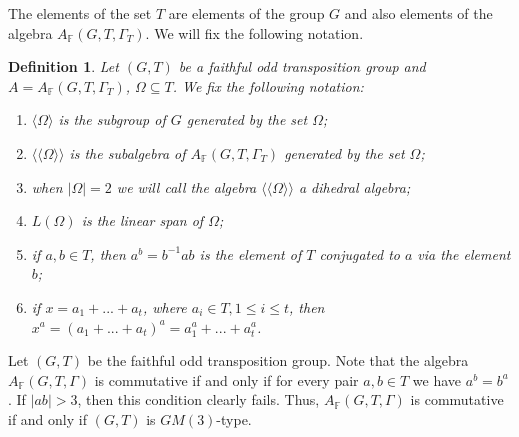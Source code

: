 \documentclass[12pt]{article}
\newcommand\F{\mathbb{F}}
\newcommand\la{\langle}
\newcommand\ra{\rangle}
\newcommand\lla{\la\!\la}
\newcommand\rra{\ra\!\ra}
\newtheorem{defi}{Definition}
\begin{document}
The elements of the set $T$ are elements of the group $G$ and also elements of the algebra $A_{\F}(G,T,\Gamma_T)$. We will fix the following notation.
\begin{defi}
Let $(G,T)$ be a faithful odd transposition group and $A=A_{\F}(G,T,\Gamma_T)$, $\Omega\subseteq T$. We fix the following notation:
\begin{enumerate}
	\item $\la \Omega\ra$ is the subgroup of $G$ generated by the set $\Omega$;
	\item $\lla \Omega \rra$ is the subalgebra of $A_{\F}(G,T,\Gamma_T)$ generated by the set $\Omega$;
    \item when $|\Omega|=2$ we will call the algebra $\lla \Omega\rra$ a dihedral algebra;
    \item $L(\Omega)$ is the linear span of $\Omega$; 
    \item if $a,b\in T$, then $a^b=b^{-1}ab$ is the element of $T$ conjugated to $a$ via the element $b$;
    \item if $x=a_1+...+a_t$, where $a_i\in T, 1\leq i\leq t$, then $x^a=(a_1+...+a_t)^a=a_1^a+...+a_t^a$.
\end{enumerate}%
\end{defi}  

	
	Let $(G,T)$ be the faithful odd transposition group. Note that the algebra $A_{\F}(G,T,\Gamma)$ is commutative if and only if for every pair $a,b\in T$ we have $a^b=b^a$. If $|ab|>3$, then this condition clearly fails. Thus, $A_{\F}(G,T,\Gamma)$ is commutative if and only if $(G,T)$ is $GM(3)$-type.
	
\end{document}
